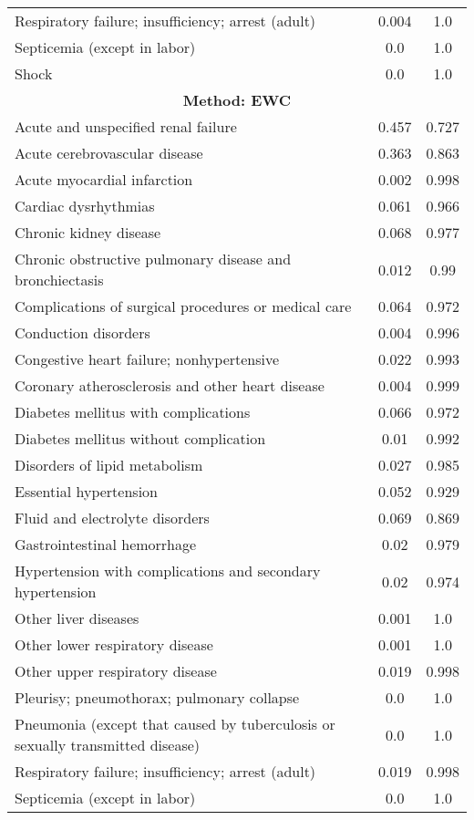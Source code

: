 \documentclass{article}
\begin{document}
\begin{longtable}{lcc}
Respiratory failure; insufficiency; arrest (adult) & 0.004 & 1.0 \\
Septicemia (except in labor) & 0.0 & 1.0 \\
Shock & 0.0 & 1.0 \\
\midrule
\multicolumn{3}{c}{\textbf{Method: EWC}} \\
\midrule
Acute and unspecified renal failure & 0.457 & 0.727 \\
Acute cerebrovascular disease & 0.363 & 0.863 \\
Acute myocardial infarction & 0.002 & 0.998 \\
Cardiac dysrhythmias & 0.061 & 0.966 \\
Chronic kidney disease & 0.068 & 0.977 \\
Chronic obstructive pulmonary disease and bronchiectasis & 0.012 & 0.99 \\
Complications of surgical procedures or medical care & 0.064 & 0.972 \\
Conduction disorders & 0.004 & 0.996 \\
Congestive heart failure; nonhypertensive & 0.022 & 0.993 \\
Coronary atherosclerosis and other heart disease & 0.004 & 0.999 \\
Diabetes mellitus with complications & 0.066 & 0.972 \\
Diabetes mellitus without complication & 0.01 & 0.992 \\
Disorders of lipid metabolism & 0.027 & 0.985 \\
Essential hypertension & 0.052 & 0.929 \\
Fluid and electrolyte disorders & 0.069 & 0.869 \\
Gastrointestinal hemorrhage & 0.02 & 0.979 \\
Hypertension with complications and secondary hypertension & 0.02 & 0.974 \\
Other liver diseases & 0.001 & 1.0 \\
Other lower respiratory disease & 0.001 & 1.0 \\
Other upper respiratory disease & 0.019 & 0.998 \\
Pleurisy; pneumothorax; pulmonary collapse & 0.0 & 1.0 \\
Pneumonia (except that caused by tuberculosis or sexually transmitted disease) & 0.0 & 1.0 \\
Respiratory failure; insufficiency; arrest (adult) & 0.019 & 0.998 \\
Septicemia (except in labor) & 0.0 & 1.0 \\

\end{longtable}
\end{document}

